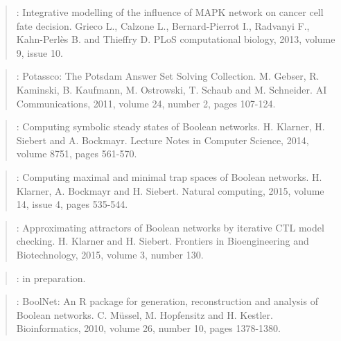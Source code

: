 \documentclass[letterpaper,10pt,english]{sphinxmanual}
\begin{document}
\label{\detokenize{Bibliography:grieco2013}}\begin{quote}

:
Integrative modelling of the influence of MAPK network on cancer cell fate decision.
Grieco L., Calzone L., Bernard-Pierrot I., Radvanyi F., Kahn-Perlès B. and Thieffry D.
PLoS computational biology, 2013, volume 9, issue 10.
\end{quote}
\label{\detokenize{Bibliography:gebser2011}}\begin{quote}

:
Potassco: The Potsdam Answer Set Solving Collection.
M. Gebser, R. Kaminski, B. Kaufmann, M. Ostrowski, T. Schaub and M. Schneider.
AI Communications, 2011, volume 24, number 2, pages 107-124.
\end{quote}
\label{\detokenize{Bibliography:klarner2014}}\begin{quote}

:
Computing symbolic steady states of Boolean networks.
H. Klarner, H. Siebert and A. Bockmayr.
Lecture Notes in Computer Science, 2014, volume 8751, pages 561-570.
\end{quote}
\label{\detokenize{Bibliography:klarner2015trap}}\begin{quote}

:
Computing maximal and minimal trap spaces of Boolean networks.
H. Klarner, A. Bockmayr and H. Siebert.
Natural computing, 2015, volume 14, issue 4, pages 535-544.
\end{quote}
\label{\detokenize{Bibliography:klarner2015approx}}\begin{quote}

:
Approximating attractors of Boolean networks by iterative CTL model checking.
H. Klarner and H. Siebert.
Frontiers in Bioengineering and Biotechnology, 2015, volume 3, number 130.
\end{quote}
\label{\detokenize{Bibliography:klarner2016basins}}\begin{quote}

:
in preparation.
\end{quote}
\label{\detokenize{Bibliography:mussel2010}}\begin{quote}

:
BoolNet: An R package for generation, reconstruction and analysis of Boolean networks.
C. Müssel, M. Hopfensitz and H. Kestler.
Bioinformatics, 2010, volume 26, number 10, pages 1378-1380.
\end{quote}
\end{document}
